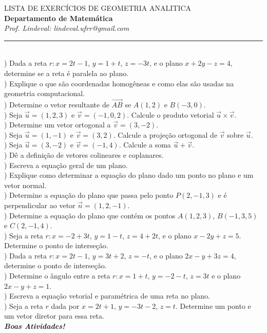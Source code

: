 \documentclass[12pt,a4paper]{article}
\begin{document}
\begin{center}
\large LISTA DE EXERCÍCIOS DE GEOMETRIA ANALITICA\\[1mm]
{\large\bf Departamento de Matemática}\\[1mm] \textit{Prof. Lindeval: lindeval.ufrr@gmail.com}\\\end{center}

\noindent\rule{17.0cm}{0.7mm}\\[0.5cm]
) Dada a reta $r: x = 2t - 1$, $y = 1 + t$, $z = -3t$, e o plano $x + 2y - z = 4$, determine se a reta é paralela ao plano.\\[2mm]
) Explique o que são coordenadas homogêneas e como elas são usadas na geometria computacional.\\[2mm]
) Determine o vetor resultante de $\vec{AB}$ se $A(1, 2)$ e $B(-3, 0)$.\\[2mm]
) Seja $\vec{u} = (1, 2, 3)$ e $\vec{v} = (-1, 0, 2)$. Calcule o produto vetorial $\vec{u} \times \vec{v}$.\\[2mm]
) Determine um vetor ortogonal a $\vec{v} = (3, -2)$.\\[2mm]
) Seja $\vec{u} = (1, -1)$ e $\vec{v} = (3, 2)$. Calcule a projeção ortogonal de $\vec{v}$ sobre $\vec{u}$.\\[2mm]
) Seja $\vec{u} = (3, -2)$ e $\vec{v} = (-1, 4)$. Calcule a soma $\vec{u} + \vec{v}$.\\[2mm]
) Dê a definição de vetores colineares e coplanares.\\[2mm]
) Escreva a equação geral de um plano.\\[2mm]
) Explique como determinar a equação do plano dado um ponto no plano e um vetor normal.\\[2mm]
) Determine a equação do plano que passa pelo ponto $P(2,-1,3)$ e é perpendicular ao vetor $\vec{n} = (1,2,-1)$.\\[2mm]
) Determine a equação do plano que contém os pontos $A(1,2,3)$, $B(-1,3,5)$ e $C(2,-1,4)$.
\\[2mm]
) Seja a reta $r: x = -2 + 3t$, $y = 1 - t$, $z = 4 + 2t$, e o plano $x - 2y + z = 5$. Determine o ponto de interseção.\\[2mm]
) Dada a reta $r: x = 2t - 1$, $y = 3t + 2$, $z = -t$, e o plano $2x - y + 3z = 4$, determine o ponto de interseção.\\[2mm]
) Determine o ângulo entre a reta $r: x = 1 + t$, $y = -2 - t$, $z = 3t$ e o plano $2x - y + z = 1$.\\[2mm]
) Escreva a equação vetorial e paramétrica de uma reta no plano.
\\[2mm]
) Seja a reta $r$ dada por $x = 2t + 1$, $y = -3t - 2$, $z = t$. Determine um ponto e um vetor diretor para essa reta.
\\[2mm]
\vfill\hfill\bf{\textit{Boas Atividades!}}
\end{document}
